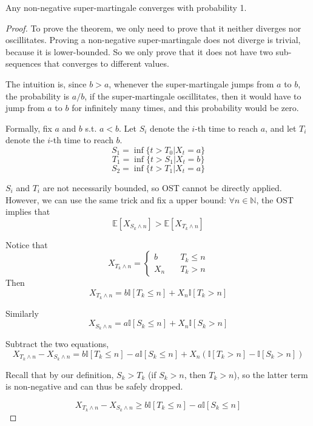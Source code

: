     \begin{theorem}\label{Thm:ConvergenceOfSuperMartingale}
        Any non-negative super-martingale converges with probability 1.
    \end{theorem}
    \begin{proof}
        To prove the theorem, we only need to prove that it neither diverges nor oscillitates. Proving a non-negative super-martingale does not diverge is trivial, because it is lower-bounded. So we only prove that it does not have two sub-sequences that converges to different values.

        The intuition is, since $b > a$, whenever the super-martingale jumps from $a$ to $b$, the probability is $a/b$, if the super-martingale oscillitates, then it would have to jump from $a$ to $b$ for infinitely many times, and this probability would be zero.

        Formally, fix $a$ and $b$ s.t. $a < b$. Let $S_i$ denote the $i$-th time to reach $a$, and let $T_i$ denote the $i$-th time to reach $b$.
        \[ S_1 = \inf\{ t > T_0 | X_t = a \} \]
        \[ T_1 = \inf\{ t > S_1 | X_t = b \} \]
        \[ S_2 = \inf\{ t > T_1 | X_t = a \} \]
        
        $S_i$ and $T_i$ are not necessarily bounded, so OST cannot be directly applied. However, we can use the same trick and fix a upper bound: $\forall n \in \mathbb{N}$, the OST implies that
        \[ \mathbb{E}[X_{S_k \wedge n}] > \mathbb{E}[X_{T_k \wedge n}] \]

        Notice that
        \[ X_{T_k \wedge n} = \begin{cases}
            b &\quad T_k \le n\\
            X_n &\quad T_k > n
        \end{cases} \]
        Then
        \[ X_{T_k \wedge n} = b\mathbb{I}[T_k \le n] + X_n\mathbb{I}[T_k > n] \]

        Similarly
        \[ X_{S_k \wedge n} = a\mathbb{I}[S_k \le n] + X_n \mathbb{I}[S_k > n] \]

        Subtract the two equations,
        \[ X_{T_k \wedge n} - X_{S_k \wedge n} = b\mathbb{I}[T_k \le n] - a\mathbb{I}[S_k \le n] + X_n \left( \mathbb{I}[T_k > n] - \mathbb{I}[S_k > n] \right) \]

        Recall that by our definition, $S_k > T_k$ (if $S_k > n$, then $T_k >n$), so the latter term is non-negative and can thus be safely dropped.

        \[ X_{T_k \wedge n} - X_{S_k \wedge n} \ge b\mathbb{I}[T_k \le n] - a\mathbb{I}[S_k \le n]  \]


\end{proof}
